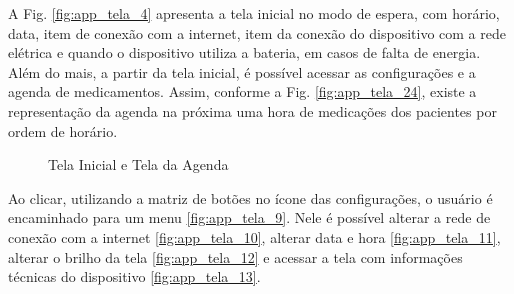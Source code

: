 \begin{apendicesenv}
A Fig. \ref{fig:app_tela_4} apresenta a tela inicial no modo de espera, com horário, data, item de conexão com a internet, item da conexão do dispositivo com a rede elétrica e quando o dispositivo utiliza a bateria, em casos de falta de energia. Além do mais, a partir da tela inicial, é possível acessar as configurações e a agenda de medicamentos. Assim, conforme a Fig. \ref{fig:app_tela_24}, existe a representação da agenda na próxima uma hora de medicações dos pacientes por ordem de horário.

\begin{figure}[!htb]
    \centering
    \caption{Tela Inicial e Tela da Agenda}\label{fig:telas_4_24}
\end{figure}

Ao clicar, utilizando a matriz de botões no ícone das configurações, o usuário é encaminhado para um menu \ref{fig:app_tela_9}. Nele é possível alterar a rede de conexão com a internet \ref{fig:app_tela_10}, alterar data e hora \ref{fig:app_tela_11}, alterar o brilho da tela \ref{fig:app_tela_12} e acessar a tela com informações técnicas do dispositivo \ref{fig:app_tela_13}.


\end{apendicesenv}
